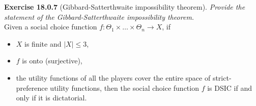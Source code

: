 \textbf{Exercise 18.0.7} (Gibbard-Satterthwaite impossibility theorem). \textit{Provide the statement of the Gibbard-Satterthwaite impossibility theorem.}\\

Given a social choice function $f: \Theta_{1} \times \ldots \times \Theta_{n} \rightarrow X$, if
\begin{itemize}
\item $X$ is finite and $|X| \leqslant 3$,
\item $f$ is onto (surjective),
\item the utility functions of all the players cover the entire space of strict-preference utility functions, then the social choice function $f$ is DSIC if and only if it is dictatorial.
\end{itemize}
